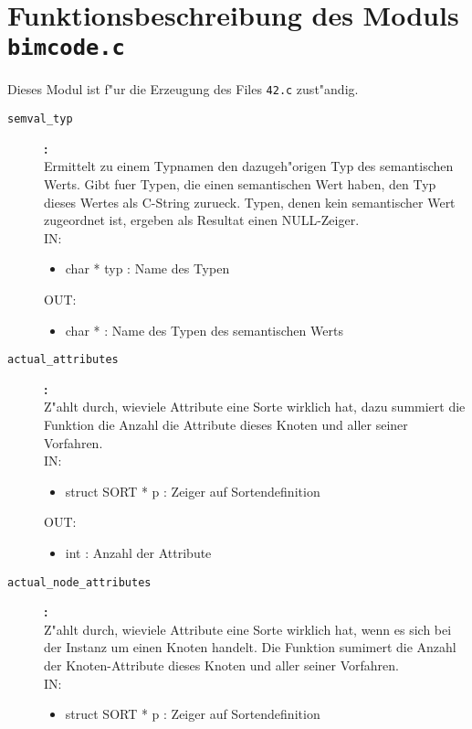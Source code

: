 \section{Funktionsbeschreibung des Moduls {\tt bimcode.c}}

Dieses Modul ist f"ur die Erzeugung des Files {\tt 42.c} zust"andig.

\begin{description}

\item[\tt semval\_typ
]{\bf :\\}
Ermittelt zu einem Typnamen den dazugeh"origen Typ des semantischen
 Werts. Gibt fuer Typen, die einen semantischen Wert haben, den Typ dieses
 Wertes als C-String zurueck. Typen, denen kein semantischer Wert zugeordnet
 ist, ergeben als Resultat einen NULL-Zeiger.
 \\
IN:
\begin{itemize}
   \item char * typ :	 Name des Typen

\end{itemize}
OUT:
\begin{itemize}
   \item char * : Name des Typen des semantischen Werts

\end{itemize}

\item[\tt actual\_attributes
]{\bf :\\}
Z"ahlt durch, wieviele Attribute eine Sorte wirklich hat, dazu
 summiert die Funktion die Anzahl die Attribute dieses Knoten und aller
 seiner Vorfahren.
 \\
IN:
\begin{itemize}
   \item struct SORT * p : Zeiger auf Sortendefinition

\end{itemize}
OUT:
\begin{itemize}
   \item int : Anzahl der Attribute

\end{itemize}

\item[\tt actual\_node\_attributes
]{\bf :\\}
Z"ahlt durch, wieviele Attribute eine Sorte wirklich hat, wenn
 es sich bei der Instanz um einen Knoten handelt.
 Die Funktion sumimert die Anzahl der Knoten-Attribute dieses Knoten und
 aller seiner Vorfahren.
 \\
IN:
\begin{itemize}
   \item struct SORT * p : Zeiger auf Sortendefinition


\end{itemize}
\end{description}
